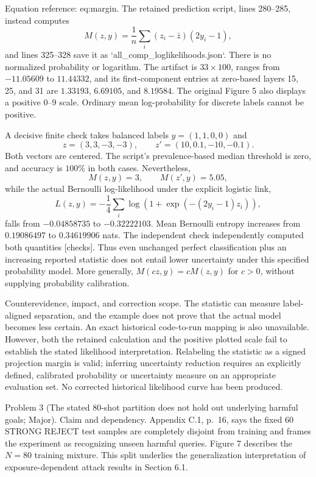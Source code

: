 \documentclass[10pt]{article}
\begin{document}
Equation reference: eq:margin. The retained prediction script, lines 280–285, instead computes \[
M(z,y)=\frac1n\sum_i(z_i-\bar z)(2y_i-1),\] and lines 325–328 save it as `all\_comp\_loglikelihoods.json`. There is no normalized probability or logarithm. The artifact is \(33\times100\), ranges from \(-11.05609\) to \(11.44332\), and its first-component entries at zero-based layers 15, 25, and 31 are \(1.33193\), \(6.69105\), and \(8.19584\). The original Figure 5 also displays a positive \(0\)–\(9\) scale. Ordinary mean log-probability for discrete labels cannot be positive.\par
A decisive finite check takes balanced labels \(y=(1,1,0,0)\) and \[z=(3,3,-3,-3),\qquad z'=(10,0.1,-10,-0.1).\] Both vectors are centered. The script’s prevalence-based median threshold is zero, and accuracy is \(100\%\) in both cases. Nevertheless, \[M(z,y)=3,\qquad M(z',y)=5.05,\] while the actual Bernoulli log-likelihood under the explicit logistic link, \[L(z,y)=-\frac14\sum_i\log\!\left(1+\exp(-(2y_i-1)z_i)\right),\] falls from \(-0.04858735\) to \(-0.32222103\). Mean Bernoulli entropy increases from \(0.19086497\) to \(0.34619906\) nats. The independent check independently computed both quantities [checks]. Thus even unchanged perfect classification plus an increasing reported statistic does not entail lower uncertainty under this specified probability model. More generally, \(M(cz,y)=cM(z,y)\) for \(c>0\), without supplying probability calibration.\par
Counterevidence, impact, and correction scope. The statistic can measure label-aligned separation, and the example does not prove that the actual model becomes less certain. An exact historical code-to-run mapping is also unavailable. However, both the retained calculation and the positive plotted scale fail to establish the stated likelihood interpretation. Relabeling the statistic as a signed projection margin is valid; inferring uncertainty reduction requires an explicitly defined, calibrated probability or uncertainty measure on an appropriate evaluation set. No corrected historical likelihood curve has been produced.\par
Problem 3 (The stated 80-shot partition does not hold out underlying harmful goals; Major).  Claim and dependency. Appendix C.1, p. 16, says the fixed 60 STRONG REJECT test samples are completely disjoint from training and frames the experiment as recognizing unseen harmful queries. Figure 7 describes the \(N=80\) training mixture. This split underlies the generalization interpretation of exposure-dependent attack results in Section 6.1.\par
\end{document}
